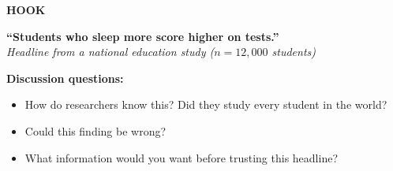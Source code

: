\documentclass[aspectratio=169, 11pt]{beamer}
\begin{document}
{
\begin{frame}[t, plain]
  \vspace{0.45cm}\par
  \hspace{0.55cm}%
  \begin{minipage}{0.9\textwidth}

    {\color{white}\bfseries\footnotesize\MakeUppercase{Hook}}\par\medskip

    {\color{white}\large\bfseries
      ``Students who sleep more score higher on tests.''}\\[0.25cm]
    {\color{white}\small\itshape
      Headline from a national education study ($n = 12{,}000$ students)}

    \vspace{0.5cm}
    {\color{white}\bfseries Discussion questions:}\par\smallskip
    \begin{itemize}
      \setlength{\itemsep}{0.4em}\setlength{\topsep}{0.1em}
      \item {\color{white}How do researchers know this?
        Did they study every student in the world?}
      \item {\color{white}Could this finding be wrong?}
      \item {\color{white}What information would you want before trusting
        this headline?}
    \end{itemize}

  \end{minipage}
\end{frame}
}
\end{document}
